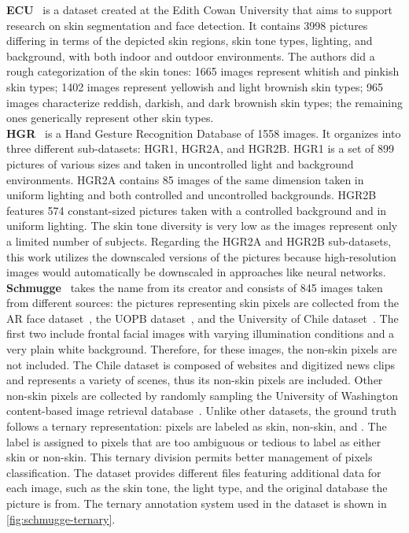 \noindent\textbf{ECU}~\cite{phung2005skin} is a dataset created at the Edith Cowan University that aims to support research on skin segmentation and face detection.
It contains 3998 pictures differing in terms of the depicted skin regions, skin tone types, lighting, and background, with both indoor and outdoor environments.
The authors did a rough categorization of the skin tones: 1665 images represent whitish and pinkish skin types; 1402 images represent yellowish and light brownish skin types; 965 images characterize reddish, darkish, and dark brownish skin types; the remaining ones generically represent other skin types.\\
\textbf{HGR}~\cite{Kawulok2014EURASIP} is a Hand Gesture Recognition Database of 1558 images. It organizes into three different sub-datasets: HGR1, HGR2A, and HGR2B.
HGR1 is a set of 899 pictures of various sizes and taken in uncontrolled light and background environments.
HGR2A contains 85 images of the same dimension taken in uniform lighting and both controlled and uncontrolled backgrounds.
HGR2B features 574 constant-sized pictures taken with a controlled background and in uniform lighting.
The skin tone diversity is very low as the images represent only a limited number of subjects.
Regarding the HGR2A and HGR2B sub-datasets, this work utilizes the downscaled versions of the pictures because high-resolution images would automatically be downscaled in approaches like neural networks.\\
\textbf{Schmugge}~\cite{schmugge2007objective} takes the name from its creator and consists of 845 images taken from different sources: the pictures representing skin pixels are collected from the AR face dataset~\cite{martinez1998ar}, the UOPB dataset~\cite{marszalec2000physics}, and the University of Chile dataset~\cite{ruiz2006skindiff}.
The first two include frontal facial images with varying illumination conditions and a very plain white background. Therefore, for these images, the non-skin pixels are not included.
The Chile dataset is composed of websites and digitized news clips and represents a variety of scenes, thus its non-skin pixels are included.
Other non-skin pixels are collected by randomly sampling the University of Washington content-based image retrieval database~\cite{berman1999flexible}.
Unlike other datasets, the ground truth follows a ternary representation: pixels are labeled as skin, non-skin, and .
The  label is assigned to pixels that are too ambiguous or tedious to label as either skin or non-skin.
This ternary division permits better management of pixels classification.
The dataset provides different files featuring additional data for each image, such as the skin tone, the light type, and the original database the picture is from. The ternary annotation system used in the dataset is shown in \autoref{fig:schmugge-ternary}.

